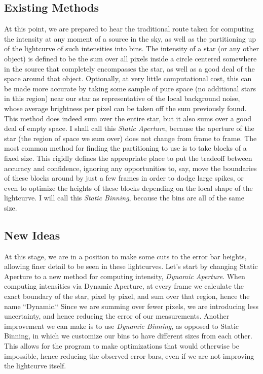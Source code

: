 \documentclass[12pt]{article}
\begin{document}
\subsection{Existing Methods}
\indent \indent At this point, we are prepared to hear the traditional route taken for computing the intensity at any moment of a source in the sky, as well as the partitioning up of the lightcurve of such intensities into bins. The intensity of a star (or any other object) is defined to be the sum over all pixels inside a circle centered somewhere in the source that completely encompasses the star, as well as a good deal of the space around that object. Optionally, at very little computational cost, this can be made more accurate by taking some sample of pure space (no additional stars in this region) near our star as representative of the local background noise, whose average brightness per pixel can be taken off the sum previously found. This method does indeed sum over the entire star, but it also sums over a good deal of empty space. I shall call this \textit{Static Aperture}, because the aperture of the star (the region of space we sum over) does not change from frame to frame.
\newline
\indent The most common method for finding the partitioning to use is to take blocks of a fixed size. This rigidly defines the appropriate place to put the tradeoff between accuracy and confidence, ignoring any opportunities to, say, move the boundaries of these blocks around by just a few frames in order to dodge large spikes, or even to optimize the heights of these blocks depending on the local shape of the lightcurve. I will call this \textit{Static Binning}, because the bins are all of the same size.
\subsection{New Ideas}
\indent \indent At this stage, we are in a position to make some cuts to the error bar heights, allowing finer detail to be seen in these lightcurves. Let's start by changing Static Aperture to a new method for computing intensity, \textit{Dynamic Aperture}. When computing intensities via Dynamic Aperture, at every frame we calculate the exact boundary of the star, pixel by pixel, and sum over that region, hence the name ``Dynamic.`` Since we are summing over fewer pixels, we are introducing less uncertainty, and hence reducing the error of our measurements. 
\newline
\indent Another improvement we can make is to use \textit{Dynamic Binning}, as opposed to Static Binning, in which we customize our bins to have different sizes from each other. This allows for the program to make optimizations that would otherwise be impossible, hence reducing the observed error bars, even if we are not improving the lightcurve itself. 
\end{document}
